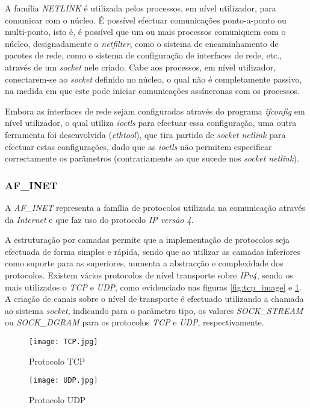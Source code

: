A família \textit{NETLINK} é utilizada pelos processos, em nível utilizador, para comunicar com o núcleo.
É possível efectuar comunicações ponto-a-ponto ou multi-ponto, isto é, é possível que um ou mais processos comuniquem com o núcleo, designadamente o \textit{netfilter}, como o sistema de encaminhamento de pacotes de rede, como o sistema de configuração de interfaces de rede, etc., através de um \textit{socket} nele criado.
Cabe aos processos, em nível utilizador, conectarem-se ao \textit{socket} definido no núcleo, o qual não é completamente passivo, na medida em que este pode iniciar comunicações assíncronas com os processos.

Embora as interfaces de rede sejam configuradas através do programa \textit{ifconfig} em nível utilizador, o qual utiliza \textit{ioctls} para efectuar essa configuração, uma outra ferramenta foi desenvolvida (\textit{ethtool}), que tira partido de \textit{socket netlink} para efectuar estas configurações, dado que as \textit{ioctls} não permitem especificar correctamente os parâmetros (contrariamente ao que sucede nos \textit{socket netlink}).

\subsubsection{AF\_INET}
\label{subsub:af_inet}

A \textit{AF\_INET} representa a família de protocolos utilizada na comunicação através da \textit{Internet} e que faz uso do protocolo \textit{IP versão 4}. %

A estruturação por camadas permite que a implementação de protocolos seja efectuada de forma simples e rápida, sendo que ao utilizar as camadas inferiores como suporte para as superiores, aumenta a abstracção e complexidade dos protocolos.\cite{TCP_IP}
Existem vários protocolos de nível transporte sobre \textit{IPv4}, sendo os mais utilizados o \textit{TCP} e \textit{UDP}, como evidenciado nas figuras \ref{fig:tcp_image} e \ref{fig:udp_image}.
A criação de canais sobre o nível de transporte é efectuado utilizando a chamada ao sistema \textit{socket}, indicando para o parâmetro tipo, os valores \textit{SOCK\_STREAM} ou \textit{SOCK\_DGRAM} para os protocolos \textit{TCP} e \textit{UDP}, respectivamente.

\begin{figure}[ht]
\begin{minipage}[b]{0.5\linewidth}
\centering
\texttt{[image: TCP.jpg]}
\caption{Protocolo TCP}
\label{fig:tcp_image}
\end{minipage}
\hspace{0.5cm}
\begin{minipage}[b]{0.5\linewidth}
\centering
\texttt{[image: UDP.jpg]}
\caption{Protocolo UDP}
\label{fig:udp_image}
\end{minipage}
\end{figure}

